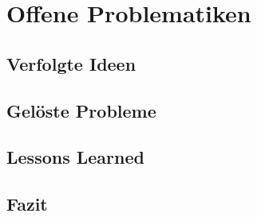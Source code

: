 \section{Offene Problematiken}
\subsection{Verfolgte Ideen}
\subsection{Gelöste Probleme}
\subsection{Lessons Learned}
\subsection{Fazit}